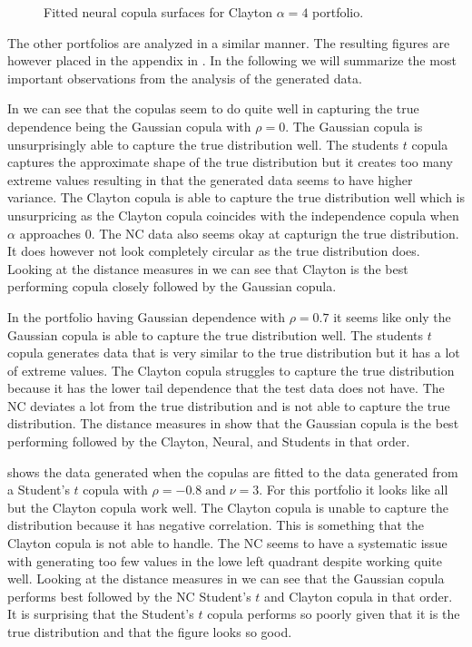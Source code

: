\begin{figure}
\begin{minipage}{0.4\textwidth}
    \end{minipage}
    \caption{Fitted neural copula surfaces for Clayton $\alpha=4$ portfolio.}
    \label{fig:GeneratedDataClayton}
\end{figure}

The other portfolios are analyzed in a similar manner. The resulting figures are however placed in the appendix in . In the following we will summarize the most important observations from the analysis of the generated data. 

In  we can see that the copulas seem to do quite well in capturing the true dependence being the Gaussian copula with $\rho = 0$. The Gaussian copula is unsurprisingly able to capture the true distribution well. The students $t$ copula captures the approximate shape of the true distribution but it creates too many extreme values resulting in that the generated data seems to have higher variance. The Clayton copula is able to capture the true distribution well which is unsurpricing as the Clayton copula coincides with the independence copula when $\alpha $ approaches 0. The \gls{NC} data also seems okay at capturign the true distribution. It does however not look completely circular as the true distribution does. Looking at the distance measures in  we can see that Clayton is the best performing copula closely followed by the Gaussian copula.  

In  the portfolio having Gaussian dependence with $\rho = 0.7$ it seems like only the Gaussian copula is able to capture the true distribution well. The students $t$ copula generates data that is very similar to the true distribution but it has a lot of extreme values. The Clayton copula struggles to capture the true distribution because it has the lower tail dependence that the test data does not have. The \gls{NC} deviates a lot from the true distribution and is not able to capture the true distribution. The distance measures in  show that the Gaussian copula is the best performing followed by the Clayton, Neural, and Students in that order. 


 shows the data generated when the copulas are fitted to the data generated from a Student's $t$ copula with $\rho = -0.8 \; \mathrm{and} \; \nu = 3$. For this portfolio it looks like all but the Clayton copula work well. The Clayton copula is unable to capture the distribution because it has negative correlation. This is something that the Clayton copula is not able to handle. The \gls{NC} seems to have a systematic issue with generating too few values in the lowe left quadrant despite working quite well. Looking at the distance measures in  we can see that the Gaussian copula performs best followed by the \gls{NC} Student's $t$ and Clayton copula in that order. It is surprising that the Student's $t$ copula performs so poorly given that it is the true distribution and that the figure looks so good. 


